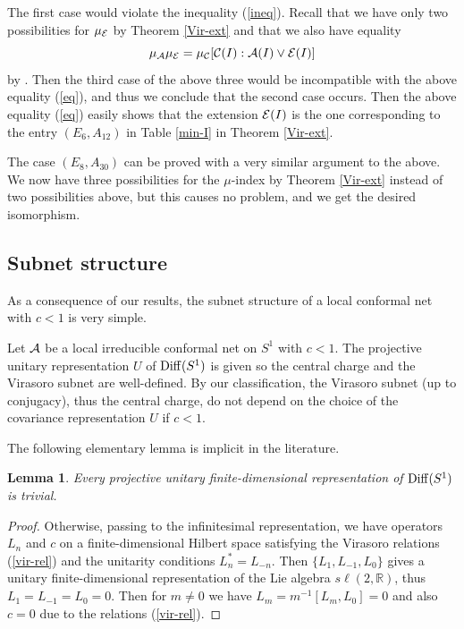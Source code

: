\documentclass[12pt]{article}
\def\Diff{{\rm Diff}}
\newtheorem{lemma}[theorem]{Lemma}
\def\A{{\cal A}}
\def\E{{\cal E}}
\begin{document}
The first case would violate the inequality (\ref{ineq}).
Recall that we have only two possibilities for $\mu_{\E}$
by Theorem \ref{Vir-ext} and that
we also have equality
\begin{equation}\label{eq}
\mu_\A \mu_\E =\mu_{\cal C} [{\cal C}(I): \A(I) \vee \E(I)]
\end{equation}
by \cite[Proposition 24]{KLM}.
Then the third case of the above three would be incompatible
with the above equality (\ref{eq}), and
thus we conclude that the second case occurs.  Then the above
equality (\ref{eq}) easily shows that
the extension $\E(I)$ is the one corresponding to the entry
$(E_6, A_{12})$ in Table \ref{min-I} in Theorem \ref{Vir-ext}.

The case $(E_8, A_{30})$ can be proved with a very similar
argument to the above.  We now have three possibilities
for the $\mu$-index by Theorem \ref{Vir-ext} instead of
two possibilities above, but this causes no problem, and
we get the desired isomorphism.

\subsection{Subnet structure}

As a consequence of our results, the subnet structure of a local 
conformal net with $c<1$ is very simple. 

Let  $\A$ be a local 
irreducible conformal net on $S^1$ with $c<1$. The projective unitary 
representation $U$ of $\Diff(S^1)$ is given so the central charge
and the Virasoro subnet are well-defined. By our classification, the 
Virasoro subnet (up to conjugacy), thus the central charge, do not 
depend on the choice of the covariance representation $U$ if $c<1$.

The following elementary lemma is implicit in the literature.

\begin{lemma}\label{ufd}
Every projective unitary finite-dimensional representation of $\Diff(S^1)$ is 
trivial.
\end{lemma}

\begin{proof}
Otherwise, passing to the infinitesimal representation, we have 
operators $L_n$ and $c$ on a finite-dimensional Hilbert space 
satisfying the Virasoro relations (\ref{vir-rel})
and the unitarity conditions $L_n^*=L_{-n}$. Then $\{L_1,L_{-1},L_0\}$ 
gives a unitary finite-dimensional representation of the Lie algebra 
$s\ell(2,\mathbb R)$, thus $L_1 = L_{-1} = L_0 = 0$. Then for $m\neq 
0$ we have $L_m=m^{-1}[L_m,L_0]= 0$ and also $c=0$ due to the 
relations (\ref{vir-rel}).
\end{proof}
\end{document}
